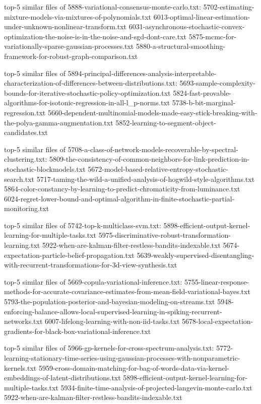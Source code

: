 \documentclass[11pt]{article}
\begin{document}
top-5 similar files of 5888-variational-consensus-monte-carlo.txt:
5702-estimating-mixture-models-via-mixtures-of-polynomials.txt
6013-optimal-linear-estimation-under-unknown-nonlinear-transform.txt
6031-asynchronous-stochastic-convex-optimization-the-noise-is-in-the-noise-and-sgd-dont-care.txt
5875-mcmc-for-variationally-sparse-gaussian-processes.txt
5880-a-structural-smoothing-framework-for-robust-graph-comparison.txt

top-5 similar files of
5894-principal-differences-analysis-interpretable-characterization-of-differences-between-distributions.txt:
5693-sample-complexity-bounds-for-iterative-stochastic-policy-optimization.txt
5824-fast-provable-algorithms-for-isotonic-regression-in-all-l\_p-norms.txt
5738-b-bit-marginal-regression.txt
5660-dependent-multinomial-models-made-easy-stick-breaking-with-the-polya-gamma-augmentation.txt
5852-learning-to-segment-object-candidates.txt

top-5 similar files of
5708-a-class-of-network-models-recoverable-by-spectral-clustering.txt:
5809-the-consistency-of-common-neighbors-for-link-prediction-in-stochastic-blockmodels.txt
5672-model-based-relative-entropy-stochastic-search.txt
5717-taming-the-wild-a-unified-analysis-of-hogwild-style-algorithms.txt
5864-color-constancy-by-learning-to-predict-chromaticity-from-luminance.txt
6024-regret-lower-bound-and-optimal-algorithm-in-finite-stochastic-partial-monitoring.txt

top-5 similar files of 5742-top-k-multiclass-svm.txt:
5898-efficient-output-kernel-learning-for-multiple-tasks.txt
5975-discriminative-robust-transformation-learning.txt
5922-when-are-kalman-filter-restless-bandits-indexable.txt
5674-expectation-particle-belief-propagation.txt
5639-weakly-supervised-disentangling-with-recurrent-transformations-for-3d-view-synthesis.txt

top-5 similar files of 5669-copula-variational-inference.txt:
5755-linear-response-methods-for-accurate-covariance-estimates-from-mean-field-variational-bayes.txt
5793-the-population-posterior-and-bayesian-modeling-on-streams.txt
5948-enforcing-balance-allows-local-supervised-learning-in-spiking-recurrent-networks.txt
6007-lifelong-learning-with-non-iid-tasks.txt
5678-local-expectation-gradients-for-black-box-variational-inference.txt

top-5 similar files of 5966-gp-kernels-for-cross-spectrum-analysis.txt:
5772-learning-stationary-time-series-using-gaussian-processes-with-nonparametric-kernels.txt
5959-cross-domain-matching-for-bag-of-words-data-via-kernel-embeddings-of-latent-distributions.txt
5898-efficient-output-kernel-learning-for-multiple-tasks.txt
5934-finite-time-analysis-of-projected-langevin-monte-carlo.txt
5922-when-are-kalman-filter-restless-bandits-indexable.txt
\end{document}
